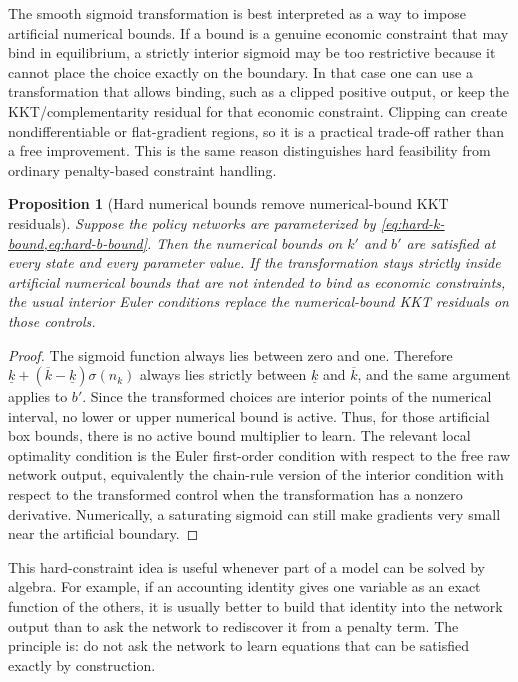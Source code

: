 \documentclass[11pt]{article}
\newtheorem{proposition}{Proposition}
\newcommand{\1}{\mathbf{1}}
\begin{document}
The smooth sigmoid transformation is best interpreted as a way to impose
artificial numerical bounds. If a bound is a genuine economic constraint that
may bind in equilibrium, a strictly interior sigmoid may be too restrictive
because it cannot place the choice exactly on the boundary. In that case one
can use a transformation that allows binding, such as a clipped positive output,
or keep the KKT/complementarity residual for that economic constraint. Clipping
can create nondifferentiable or flat-gradient regions, so it is a practical
trade-off rather than a free improvement. This is the same reason
\citet{hallhoffarth2023hard} distinguishes hard feasibility from ordinary
penalty-based constraint handling.

\begin{proposition}[Hard numerical bounds remove numerical-bound KKT residuals]
\label{prop:hard-bounds-remove-kkt}
Suppose the policy networks are parameterized by
\cref{eq:hard-k-bound,eq:hard-b-bound}. Then the numerical bounds on \(k'\) and
\(b'\) are satisfied at every state and every parameter value. If the
transformation stays strictly inside artificial numerical bounds that are not
intended to bind as economic constraints, the usual interior Euler conditions
replace the numerical-bound KKT residuals on those controls.
\end{proposition}

\begin{proof}
The sigmoid function always lies between zero and one. Therefore
\(\underline k+(\overline k-\underline k)\sigma(n_k)\) always lies strictly
between \(\underline k\) and \(\overline k\), and the same argument applies to
\(b'\). Since the transformed choices are interior points of the numerical
interval, no lower or upper numerical bound is active. Thus, for those artificial
box bounds, there is no active bound multiplier to learn. The relevant local
optimality condition is the Euler first-order condition with respect to the
free raw network output, equivalently the chain-rule version of the interior
condition with respect to the transformed control when the transformation has a
nonzero derivative. Numerically, a saturating sigmoid can still make gradients
very small near the artificial boundary.
\end{proof}

This hard-constraint idea is useful whenever part of a model can be solved by
algebra. For example, if an accounting identity gives one variable as an exact
function of the others, it is usually better to build that identity into the
network output than to ask the network to rediscover it from a penalty term.
The principle is: do not ask the network to learn equations that can be
satisfied exactly by construction.
\end{document}
